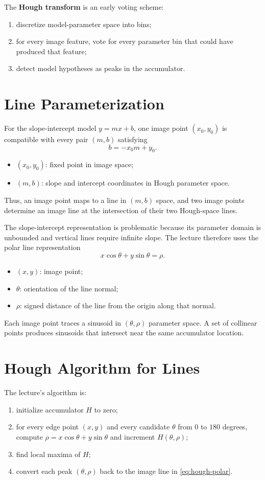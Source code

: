 \documentclass[11pt,a4paper,oneside]{report}
\newcommand{\mathlegend}[1]{%
  \par\vspace{0.2em}{\small\itshape where}\par
  \begin{itemize}[leftmargin=1.7em,topsep=0.15em,itemsep=0.12em]
  #1
  \end{itemize}
}
\begin{document}
The \textbf{Hough transform} is an early voting scheme:
\begin{enumerate}
  \item discretize model-parameter space into bins;
  \item for every image feature, vote for every parameter bin that could have produced that feature;
  \item detect model hypotheses as peaks in the accumulator.
\end{enumerate}

\section{Line Parameterization}

For the slope-intercept model $y=mx+b$, one image point $(x_0,y_0)$ is compatible with every pair $(m,b)$ satisfying
\begin{equation}
  b=-x_0m+y_0.
  \label{eq:hough-mb}
\end{equation}
\mathlegend{
  \item $(x_0,y_0)$: fixed point in image space;
  \item $(m,b)$: slope and intercept coordinates in Hough parameter space.
}
Thus, an image point maps to a line in $(m,b)$ space, and two image points determine an image line at the intersection of their two Hough-space lines.

The slope-intercept representation is problematic because its parameter domain is unbounded and vertical lines require infinite slope. The lecture therefore uses the polar line representation
\begin{equation}
  x\cos\theta+y\sin\theta=\rho.
  \label{eq:hough-polar}
\end{equation}
\mathlegend{
  \item $(x,y)$: image point;
  \item $\theta$: orientation of the line normal;
  \item $\rho$: signed distance of the line from the origin along that normal.
}
Each image point traces a sinusoid in $(\theta,\rho)$ parameter space. A set of collinear points produces sinusoids that intersect near the same accumulator location.

\section{Hough Algorithm for Lines}

The lecture's algorithm is:
\begin{enumerate}
  \item initialize accumulator $H$ to zero;
  \item for every edge point $(x,y)$ and every candidate $\theta$ from $0$ to $180$ degrees, compute $\rho=x\cos\theta+y\sin\theta$ and increment $H(\theta,\rho)$;
  \item find local maxima of $H$;
  \item convert each peak $(\theta,\rho)$ back to the image line in \cref{eq:hough-polar}.
\end{enumerate}
\end{document}
